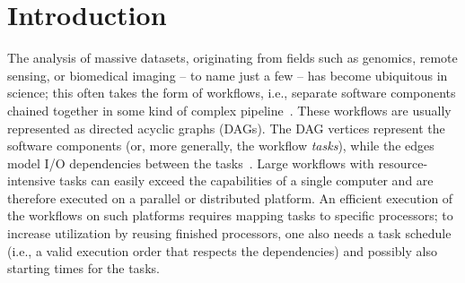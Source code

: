 \documentclass[conference]{IEEEtran}
\newcommand{\skug}[1]{{\color{blue}[SK: #1]}}
\renewcommand{\iec}{i.e., }
\begin{document}
\begin{abstract}



    \end{abstract}


\section{Introduction} %

%

    The analysis of massive datasets, originating from fields such as genomics, 
    remote sensing, or biomedical imaging -- to name just a few -- has become ubiquitous in science;
    this often takes the form of workflows, \iec separate software components chained together
    in some kind of complex pipeline~\cite{DBLP:journals/dbsk/LeserHDEGHKKKKK21}.
    These workflows are usually represented as directed acyclic graphs (DAGs).
    The DAG vertices represent the software components (or, more generally, the workflow \emph{tasks}),
    while the edges model I/O dependencies between the tasks~\cite{adhikari2019survey,liu2018survey}.
    Large workflows with resource-intensive tasks can easily exceed the capabilities of a 
    single computer and are therefore executed on a parallel or distributed platform.
    An efficient execution of the workflows on such platforms requires mapping tasks
    to specific processors; to increase utilization by reusing finished processors,
    one also needs a task schedule (\iec a valid execution order that respects the dependencies)
    and possibly also starting times for the tasks.
    
\end{document}

